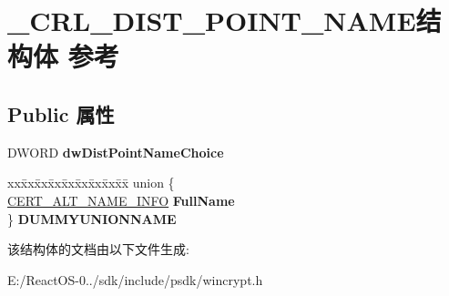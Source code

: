 \hypertarget{struct___c_r_l___d_i_s_t___p_o_i_n_t___n_a_m_e}{}\section{\+\_\+\+C\+R\+L\+\_\+\+D\+I\+S\+T\+\_\+\+P\+O\+I\+N\+T\+\_\+\+N\+A\+M\+E结构体 参考}
\label{struct___c_r_l___d_i_s_t___p_o_i_n_t___n_a_m_e}
\subsection*{Public 属性}
\begin{DoxyCompactItemize}
\item 
\mbox{\label{struct___c_r_l___d_i_s_t___p_o_i_n_t___n_a_m_e_af6f8a40692512dfe0c1aa8fc32bc6fc3}} 
D\+W\+O\+RD {\bfseries dw\+Dist\+Point\+Name\+Choice}
\item 
\mbox{\label{struct___c_r_l___d_i_s_t___p_o_i_n_t___n_a_m_e_aa222a5213070533d4dfb17579a8decba}} 
\begin{tabbing}
xx\=xx\=xx\=xx\=xx\=xx\=xx\=xx\=xx\=\kill
union \{\\
\>\hyperlink{struct___c_e_r_t___a_l_t___n_a_m_e___i_n_f_o}{CERT\_ALT\_NAME\_INFO} {\bfseries FullName}\\
\} {\bfseries DUMMYUNIONNAME}\\

\end{tabbing}\end{DoxyCompactItemize}


该结构体的文档由以下文件生成\+:\begin{DoxyCompactItemize}
\item 
E\+:/\+React\+O\+S-\/0../sdk/include/psdk/wincrypt.\+h\end{DoxyCompactItemize}
